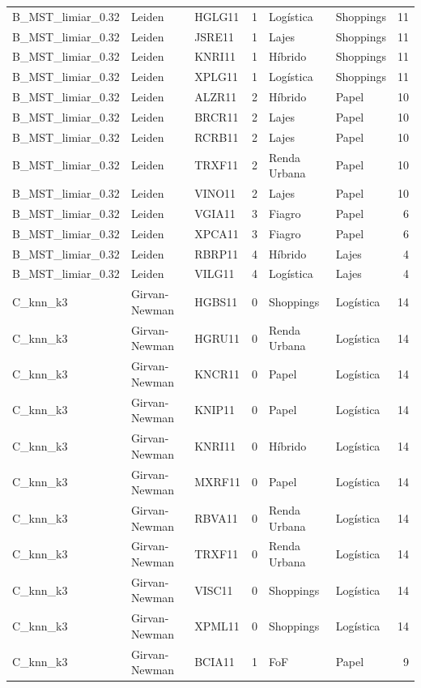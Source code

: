 \begin{tabular}{lllrllr}
B\_MST\_limiar\_0.32 & Leiden & HGLG11 & 1 & Logística & Shoppings & 11 \\
B\_MST\_limiar\_0.32 & Leiden & JSRE11 & 1 & Lajes & Shoppings & 11 \\
B\_MST\_limiar\_0.32 & Leiden & KNRI11 & 1 & Híbrido & Shoppings & 11 \\
B\_MST\_limiar\_0.32 & Leiden & XPLG11 & 1 & Logística & Shoppings & 11 \\
B\_MST\_limiar\_0.32 & Leiden & ALZR11 & 2 & Híbrido & Papel & 10 \\
B\_MST\_limiar\_0.32 & Leiden & BRCR11 & 2 & Lajes & Papel & 10 \\
B\_MST\_limiar\_0.32 & Leiden & RCRB11 & 2 & Lajes & Papel & 10 \\
B\_MST\_limiar\_0.32 & Leiden & TRXF11 & 2 & Renda Urbana & Papel & 10 \\
B\_MST\_limiar\_0.32 & Leiden & VINO11 & 2 & Lajes & Papel & 10 \\
B\_MST\_limiar\_0.32 & Leiden & VGIA11 & 3 & Fiagro & Papel & 6 \\
B\_MST\_limiar\_0.32 & Leiden & XPCA11 & 3 & Fiagro & Papel & 6 \\
B\_MST\_limiar\_0.32 & Leiden & RBRP11 & 4 & Híbrido & Lajes & 4 \\
B\_MST\_limiar\_0.32 & Leiden & VILG11 & 4 & Logística & Lajes & 4 \\
C\_knn\_k3 & Girvan-Newman & HGBS11 & 0 & Shoppings & Logística & 14 \\
C\_knn\_k3 & Girvan-Newman & HGRU11 & 0 & Renda Urbana & Logística & 14 \\
C\_knn\_k3 & Girvan-Newman & KNCR11 & 0 & Papel & Logística & 14 \\
C\_knn\_k3 & Girvan-Newman & KNIP11 & 0 & Papel & Logística & 14 \\
C\_knn\_k3 & Girvan-Newman & KNRI11 & 0 & Híbrido & Logística & 14 \\
C\_knn\_k3 & Girvan-Newman & MXRF11 & 0 & Papel & Logística & 14 \\
C\_knn\_k3 & Girvan-Newman & RBVA11 & 0 & Renda Urbana & Logística & 14 \\
C\_knn\_k3 & Girvan-Newman & TRXF11 & 0 & Renda Urbana & Logística & 14 \\
C\_knn\_k3 & Girvan-Newman & VISC11 & 0 & Shoppings & Logística & 14 \\
C\_knn\_k3 & Girvan-Newman & XPML11 & 0 & Shoppings & Logística & 14 \\
C\_knn\_k3 & Girvan-Newman & BCIA11 & 1 & FoF & Papel & 9 \\

\end{tabular}
